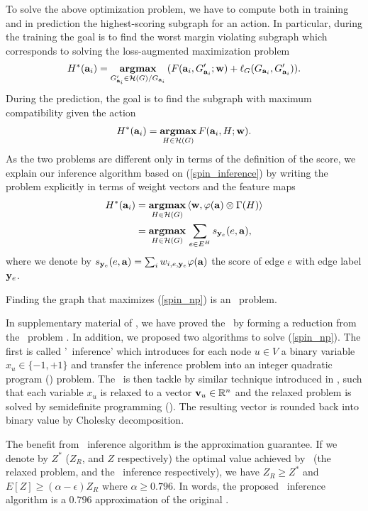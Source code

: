 {%
To solve the above optimization problem, we have to compute both in training and in prediction the highest-scoring subgraph for an action. 
In particular, during the training the goal is to find the worst margin violating subgraph which corresponds to solving the loss-augmented maximization problem
\begin{align*}
	H^*(\mathbf {a}_i) = \underset{G_{\mathbf {a}_i}'\in\mathcal{H}(G)/G_{\mathbf {a}_i}}{\textbf{argmax}}\, (F(\mathbf {a}_i,G_{\mathbf {a}_i}';\mathbf {w})+\mathbf {\ell}_{G}(G_{\mathbf {a}_i},G_{\mathbf {a}_i}')).
\end{align*}
During the prediction, the goal is to find the subgraph with maximum compatibility given the action
\begin{align}
	H^*(\mathbf {a}_i) = \underset{H\in\mathcal{H}(G)}{\textbf{argmax}}\, F(\mathbf {a}_i,H;\mathbf {w}) \label{spin_inference}.
\end{align}
As the two problems are different only in terms of the definition of the score, we explain our inference algorithm based on (\ref{spin_inference}) by writing the problem explicitly in terms of weight vectors and the feature maps
\begin{align}
	H^*(\mathbf {a}_i) &= \underset{H\in\mathcal{H}(G)}{\textbf{argmax}}\, \langle \mathbf {w}, \varphi(\mathbf {a})\otimes\Gamma(H) \rangle \nonumber \\
	&= \underset{H\in\mathcal{H}(G)}{\textbf{argmax}}\, \sum_{e\in E^H}s_{\mathbf {y}_e}(e,\mathbf {a}), \label{spin_np}
\end{align}
where we denote by $s_{\mathbf {y}_e}(e,\mathbf {a}) = \sum_{i}w_{i,e,\mathbf {y}_e}\varphi(\mathbf {a})$ the score of edge $e$ with edge label $\mathbf {y}_e$.

\begin{lemma}
	Finding the graph that maximizes (\ref{spin_np}) is an \nphard\ problem.
\end{lemma}
In supplementary material of , we have proved the \nphardness\ by forming a reduction from the \maxcut\ problem \citep{Garey90computers}.
In addition, we proposed two algorithms to solve (\ref{spin_np}).
The first is called '{\sdp\ inference}' which introduces for each node $u\in V$ a binary variable $x_u\in\{-1,+1\}$ and transfer the inference problem into an integer quadratic program (\iqp) problem.
The \iqp\ is then tackle by similar technique introduced in \citep{Geomans1995improved}, such that each variable $x_u$ is relaxed to a vector $\mathbf {v}_u\in\mathbb{R}^n$ and the relaxed problem is solved by semidefinite programming (\sdp). 
The resulting vector is rounded back into binary value by Cholesky decomposition.

The benefit from \sdp\ inference algorithm is the approximation guarantee. 
If we denote by $Z^*$ ($Z_R$, and $Z$ respectively) the optimal value achieved by \iqp\ (the relaxed problem, and the \sdp\ inference respectively), we have $Z_R\ge Z^*$ and $E[Z]\ge(\alpha-\epsilon)Z_R$ where $\alpha\ge0.796$.
In words, the proposed \sdp\ inference algorithm is a $0.796$ approximation of the original \iqp.

}
